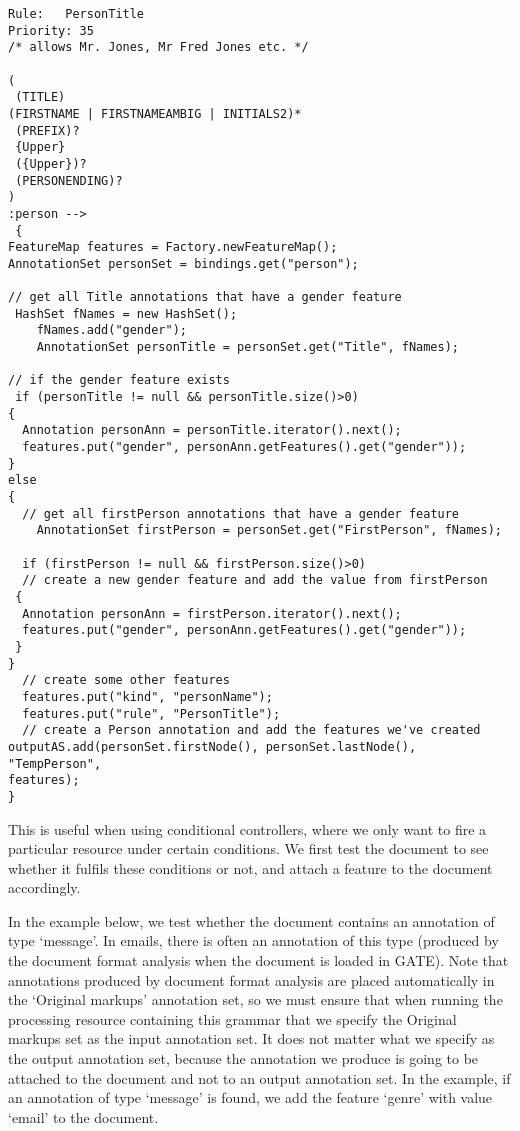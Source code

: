 \begin{small}
\begin{verbatim}
Rule:	PersonTitle
Priority: 35
/* allows Mr. Jones, Mr Fred Jones etc. */
 
(
 (TITLE)
(FIRSTNAME | FIRSTNAMEAMBIG | INITIALS2)*
 (PREFIX)?
 {Upper}
 ({Upper})?
 (PERSONENDING)?
)
:person -->
 {
FeatureMap features = Factory.newFeatureMap();
AnnotationSet personSet = bindings.get("person");
  
// get all Title annotations that have a gender feature 
 HashSet fNames = new HashSet();
    fNames.add("gender");
    AnnotationSet personTitle = personSet.get("Title", fNames);

// if the gender feature exists
 if (personTitle != null && personTitle.size()>0)
{
  Annotation personAnn = personTitle.iterator().next();
  features.put("gender", personAnn.getFeatures().get("gender"));
}
else
{
  // get all firstPerson annotations that have a gender feature
    AnnotationSet firstPerson = personSet.get("FirstPerson", fNames);

  if (firstPerson != null && firstPerson.size()>0)
  // create a new gender feature and add the value from firstPerson
 {
  Annotation personAnn = firstPerson.iterator().next();
  features.put("gender", personAnn.getFeatures().get("gender"));
 }
}
  // create some other features
  features.put("kind", "personName");
  features.put("rule", "PersonTitle");
  // create a Person annotation and add the features we've created
outputAS.add(personSet.firstNode(), personSet.lastNode(), "TempPerson",
features);
}
\end{verbatim}
\end{small}




This is useful when using conditional controllers, where we only want to fire
a particular resource under certain conditions. We first test the
document to see whether it fulfils these conditions or not, and attach
a feature to the document accordingly. 

In the example below, we test whether the document contains an 
annotation of type `message'. In emails, there is often an annotation
of this type (produced by the document format analysis when the
document is loaded in GATE). Note that annotations produced by
document format analysis are placed automatically in the `Original
markups' annotation set, so we must ensure that when running the
processing resource containing this grammar that we specify the
Original markups set as the input annotation set. It does not matter
what we specify as the output annotation set, because the annotation
we produce is going to be attached to the document and not to an
output annotation set. In the example, if an annotation of type
`message' is found, we add the feature `genre' with value `email' to
the document.

